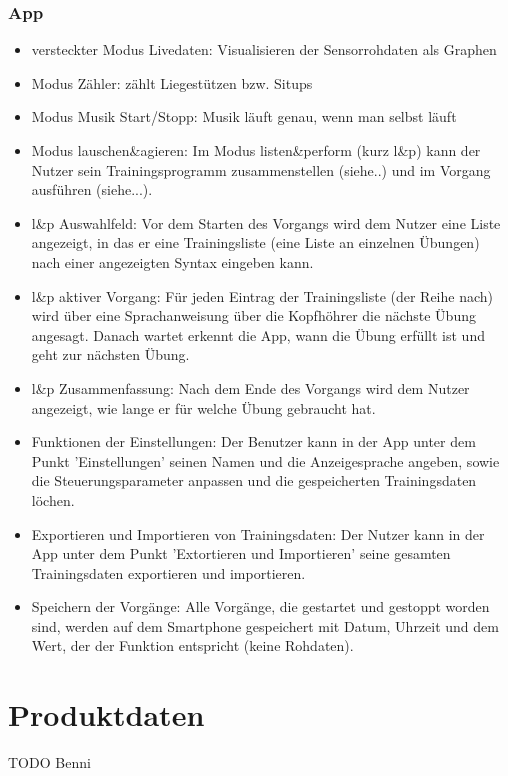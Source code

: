 \documentclass[a4paper,12pt]{article}
\begin{document}
    \subsubsection{App}
    \begin{itemize}
      
      \item[] \textsf{versteckter Modus Livedaten:} Visualisieren der Sensorrohdaten als Graphen    
      \item[] \textsf{Modus Zähler:} zählt Liegestützen bzw. Situps
      \item[] \textsf{Modus Musik Start/Stopp:} Musik läuft genau, wenn man selbst läuft
      \item[] \textsf{Modus lauschen\&agieren:} Im Modus listen\&perform (kurz l\&p) kann der Nutzer sein Trainingsprogramm zusammenstellen (siehe..) und im Vorgang ausführen (siehe...). 
      \item[] \textsf{l\&p Auswahlfeld:} Vor dem Starten des Vorgangs wird dem Nutzer eine Liste angezeigt, in das er eine Trainingsliste (eine Liste an einzelnen Übungen) nach einer angezeigten Syntax eingeben kann.
      \item[] \textsf{l\&p aktiver Vorgang:} Für jeden Eintrag der Trainingsliste (der Reihe nach) wird über eine Sprachanweisung über die Kopfhöhrer die nächste Übung angesagt. Danach wartet erkennt die App, wann die Übung erfüllt ist und geht zur nächsten Übung.
      \item[] \textsf{l\&p Zusammenfassung:} Nach dem Ende des Vorgangs wird dem Nutzer angezeigt, wie lange er für welche Übung gebraucht hat.
      \item[] \textsf{Funktionen der Einstellungen:} Der Benutzer kann in der App unter dem Punkt 'Einstellungen' seinen Namen und die Anzeigesprache angeben, sowie die Steuerungsparameter anpassen und die gespeicherten Trainingsdaten löchen.
      \item[] \textsf{Exportieren und Importieren von Trainingsdaten:} Der Nutzer kann in der App unter dem Punkt 'Extortieren und Importieren' seine gesamten Trainingsdaten exportieren und importieren.
      \item[] \textsf{Speichern der Vorgänge:} Alle Vorgänge, die gestartet und gestoppt worden sind, werden auf dem Smartphone gespeichert mit Datum, Uhrzeit und dem Wert, der der Funktion entspricht (keine Rohdaten).   
    \end{itemize}


\section{Produktdaten}
TODO Benni
\end{document}
